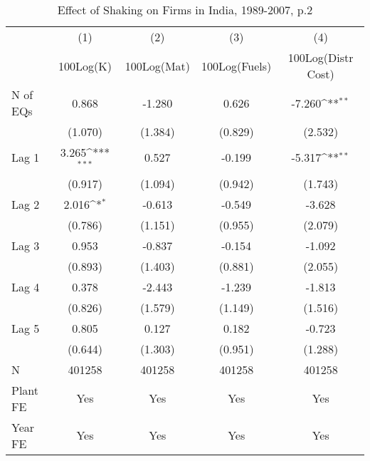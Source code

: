 \begin{table}[htbp]\centering
\def\sym#1{\ifmmode^{#1}\else\(^{#1}\)\fi}
\caption{Effect of Shaking on Firms in India, 1989-2007, p.2}
\begin{tabular}{l*{4}{c}}
\toprule
                &\multicolumn{1}{c}{(1)}&\multicolumn{1}{c}{(2)}&\multicolumn{1}{c}{(3)}&\multicolumn{1}{c}{(4)}\\
                &\multicolumn{1}{c}{100Log(K)}&\multicolumn{1}{c}{100Log(Mat)}&\multicolumn{1}{c}{100Log(Fuels)}&\multicolumn{1}{c}{100Log(Distr Cost)}\\
\midrule
N of EQs        &    0.868         &   -1.280         &    0.626         &   -7.260\sym{**} \\
                &  (1.070)         &  (1.384)         &  (0.829)         &  (2.532)         \\
\addlinespace
Lag 1           &    3.265\sym{***}&    0.527         &   -0.199         &   -5.317\sym{**} \\
                &  (0.917)         &  (1.094)         &  (0.942)         &  (1.743)         \\
\addlinespace
Lag 2           &    2.016\sym{*}  &   -0.613         &   -0.549         &   -3.628         \\
                &  (0.786)         &  (1.151)         &  (0.955)         &  (2.079)         \\
\addlinespace
Lag 3           &    0.953         &   -0.837         &   -0.154         &   -1.092         \\
                &  (0.893)         &  (1.403)         &  (0.881)         &  (2.055)         \\
\addlinespace
Lag 4           &    0.378         &   -2.443         &   -1.239         &   -1.813         \\
                &  (0.826)         &  (1.579)         &  (1.149)         &  (1.516)         \\
\addlinespace
Lag 5           &    0.805         &    0.127         &    0.182         &   -0.723         \\
                &  (0.644)         &  (1.303)         &  (0.951)         &  (1.288)         \\
\midrule
N               &   401258         &   401258         &   401258         &   401258         \\
Plant FE        &      Yes         &      Yes         &      Yes         &      Yes         \\
Year FE         &      Yes         &      Yes         &      Yes         &      Yes         \\

\end{tabular}
\end{table}
